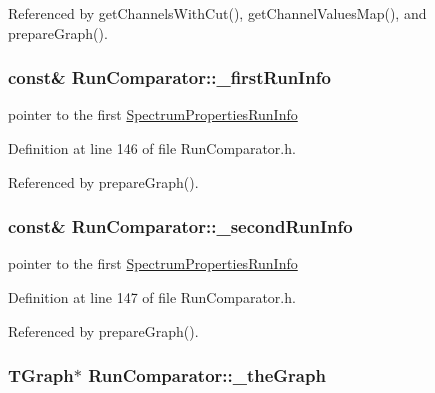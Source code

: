 Referenced by getChannelsWithCut(), getChannelValuesMap(), and prepareGraph().\hypertarget{class_run_comparator_a3893b88661dc9ab2c46b8881d20772a2}{
\subsubsection[{\_\-firstRunInfo}]{ const\& {\bf RunComparator::\_\-firstRunInfo}}}
\label{class_run_comparator_a3893b88661dc9ab2c46b8881d20772a2}


pointer to the first \hyperlink{class_spectrum_properties_run_info}{SpectrumPropertiesRunInfo} 

Definition at line 146 of file RunComparator.h.

Referenced by prepareGraph().\hypertarget{class_run_comparator_a2dc5760e0e8acc987f8a56a906895e5a}{
\subsubsection[{\_\-secondRunInfo}]{ const\& {\bf RunComparator::\_\-secondRunInfo}}}
\label{class_run_comparator_a2dc5760e0e8acc987f8a56a906895e5a}


pointer to the first \hyperlink{class_spectrum_properties_run_info}{SpectrumPropertiesRunInfo} 

Definition at line 147 of file RunComparator.h.

Referenced by prepareGraph().\hypertarget{class_run_comparator_ade24b6bfa3960ac66f027a2669014d6a}{
\subsubsection[{\_\-theGraph}]{\setlength{\rightskip}{0pt plus 5cm}TGraph$\ast$ {\bf RunComparator::\_\-theGraph}}}
\label{class_run_comparator_ade24b6bfa3960ac66f027a2669014d6a}


